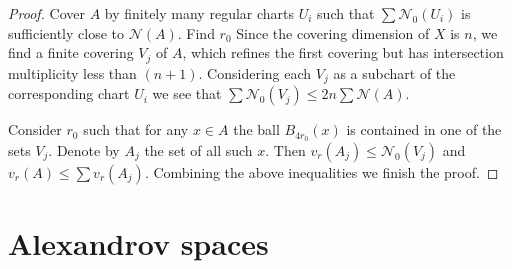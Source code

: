 \documentclass[12pt,leqno]{amsart}
\numberwithin{equation}{section}
\theoremstyle{definition}
\theoremstyle{remark}
\begin{document}
\begin{proof}
Cover $A$ by finitely many regular charts $U_i$ such that $\sum \mathcal N_0 (U_i)$ is sufficiently close to $\mathcal N (A)$. Find $r_0$
Since the covering dimension of $X$ is $n$, we find   a finite covering $V_j$ of $A$, which refines  the first covering but has intersection multiplicity less than $(n+1)$.  Considering each $V_j$ as a subchart of the corresponding chart $U_i$ we see that $\sum \mathcal N_0 (V_j) \leq 2n \sum \mathcal N(A)$.

Consider $r_0$ such that for any $x\in A$ the ball $B_{4r_0} (x)$ is contained in one of the sets $V_j$.   Denote by $A_j$ the set of all such $x$.
Then $v_r (A_j) \leq  \mathcal N_0 (V_j)$ and $v_r (A) \leq \sum v_r (A_j)$.  Combining the above inequalities we finish the proof.
\end{proof}















\section{Alexandrov spaces} \label{sec:Alex}
\end{document}
